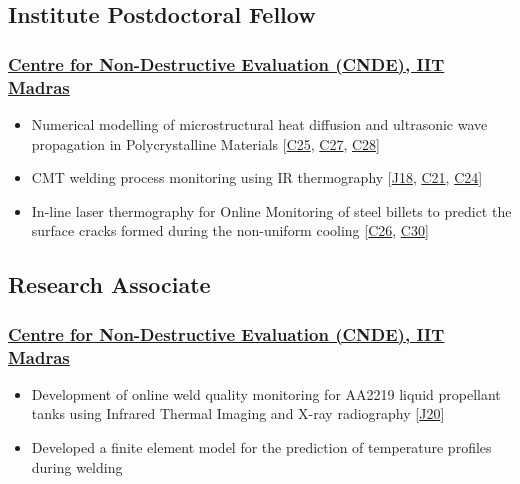 \documentclass{my_cv}%
\begin{document}
\subsection{Institute Postdoctoral Fellow}
\subsubsection{\href{https://www.cnde.in/}{Centre for Non-Destructive Evaluation (CNDE), IIT Madras}}
\begin{itemize}[leftmargin=0.15in]
\setlength\itemsep{-0.1em}
\color{mygray}
\item Numerical modelling of microstructural heat diffusion and ultrasonic wave propagation in Polycrystalline Materials [\textcolor{mypink}{\hyperref[C25]{C25}}, \textcolor{mypink}{\hyperref[C27]{C27}}, \textcolor{mypink}{\hyperref[C28]{C28}}]
\item CMT welding process monitoring using IR thermography [\textcolor{mypink}{\hyperref[J18]{J18}}, \textcolor{mypink}{\hyperref[C21]{C21}}, \textcolor{mypink}{\hyperref[C24]{C24}}]
\item In-line laser thermography for Online Monitoring of steel billets to predict the surface cracks formed during the non-uniform cooling [\textcolor{mypink}{\hyperref[C26]{C26}}, \textcolor{mypink}{\hyperref[C30]{C30}}]
\end{itemize}
{\color{mygray1} \hdashrule[0.1ex]{18.8cm}{0.2mm}{1mm}}
\subsection{Research Associate}
\subsubsection{\href{https://www.cnde.in/}{Centre for Non-Destructive Evaluation (CNDE), IIT Madras}}
\begin{itemize}[leftmargin=0.15in]
\setlength\itemsep{-0.1em}
\color{mygray}
\item Development of online weld quality monitoring for AA2219 liquid propellant tanks using Infrared Thermal Imaging and X-ray radiography [\textcolor{mypink}{\hyperref[J20]{J20}}]
\item Developed a finite element model for the prediction of temperature profiles during welding
\end{itemize}
\end{document}
